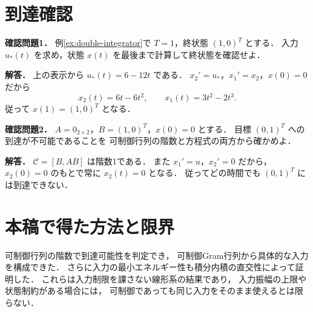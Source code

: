 \documentclass[a5paper,10pt,onecolumn]{jsarticle}
\theoremstyle{mathnotetheorem}
\begin{document}
\section*{到達確認}
\noindent\textbf{確認問題1．}
例\ref{ex:double-integrator}で $T=1$，終状態 $(1,0)^T$ とする．
入力 $u_*(t)$ を求め，状態 $x(t)$ を最後まで計算して終状態を確認せよ．

\medskip\noindent\textbf{解答．}
上の表示から $u_*(t)=6-12t$ である．
$x_2'=u_*$，$x_1'=x_2$，$x(0)=0$ だから
\[
 x_2(t)=6t-6t^2,\qquad x_1(t)=3t^2-2t^3.
\]
従って $x(1)=(1,0)^T$ となる．

\medskip\noindent\textbf{確認問題2．}
$A=0_{2\times2}$，$B=(1,0)^T$，$x(0)=0$ とする．
目標 $(0,1)^T$ への到達が不可能であることを
可制御行列の階数と方程式の両方から確かめよ．

\medskip\noindent\textbf{解答．}
$\mathcal C=[B,AB]$ は階数1である．
また $x_1'=u$，$x_2'=0$ だから，
$x_2(0)=0$ のもとで常に $x_2(t)=0$ となる．
従ってどの時間でも $(0,1)^T$ には到達できない．

\section*{本稿で得た方法と限界}
\noindent 可制御行列の階数で到達可能性を判定でき，
可制御Gram行列から具体的な入力を構成できた．
さらに入力の最小エネルギー性も積分内積の直交性によって証明した．
これらは入力制限を課さない線形系の結果であり，
入力振幅の上限や状態制約がある場合には，
可制御であっても同じ入力をそのまま使えるとは限らない．
\end{document}
